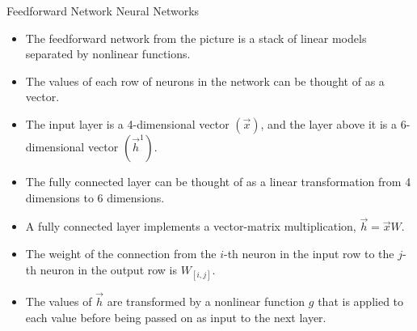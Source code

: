 \documentclass[handout]{beamer}
\begin{document}
\begin{frame}{Feedforward Network Neural Networks}
\begin{scriptsize}
\begin{itemize}
\item The feedforward network from the picture is a stack of linear models separated by nonlinear functions.
\item The values of each row of neurons in the network can be thought of as a vector. 

\item The input layer is a 4-dimensional vector $(\vec{x})$, and the layer above it is a 6-dimensional vector $(\vec{h}^1)$.
\item The fully connected layer can be thought of as a linear transformation from 4 dimensions to 6 dimensions. 
\item A fully connected layer implements a vector-matrix multiplication, $\vec{h}=\vec{x}W$.
\item The weight of the connection from the $i$-th neuron in the input row to the $j$-th neuron in the output row is $W_{[i,j]}$.
\item The values of $\vec{h}$ are transformed by a nonlinear function $g$ that is applied to each value before being passed on as input to the next layer.

\end{itemize}


\end{scriptsize}
\end{frame}
\end{document}
